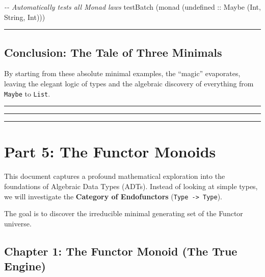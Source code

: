 \documentclass[
]{article}
\newenvironment{Shaded}{}{}
\newcommand{\CommentTok}[1]{\textcolor[rgb]{0.38,0.63,0.69}{\textit{#1}}}
\newcommand{\DataTypeTok}[1]{\textcolor[rgb]{0.56,0.13,0.00}{#1}}
\newcommand{\FunctionTok}[1]{\textcolor[rgb]{0.02,0.16,0.49}{#1}}
\newcommand{\NormalTok}[1]{#1}
\newcommand{\OtherTok}[1]{\textcolor[rgb]{0.00,0.44,0.13}{#1}}
\begin{document}
\begin{Shaded}
\begin{Highlighting}[]
  \CommentTok{{-}{-} Automatically tests all Monad laws}
\NormalTok{  testBatch (monad (}\FunctionTok{undefined}\OtherTok{ ::} \DataTypeTok{Maybe}\NormalTok{ (}\DataTypeTok{Int}\NormalTok{, }\DataTypeTok{String}\NormalTok{, }\DataTypeTok{Int}\NormalTok{)))}
\end{Highlighting}
\end{Shaded}

\begin{center}\rule{0.5\linewidth}{0.5pt}\end{center}

\subsection{Conclusion: The Tale of Three
Minimals}\label{conclusion-the-tale-of-three-minimals}

By starting from these absolute minimal examples, the ``magic''
evaporates, leaving the elegant logic of types and the algebraic
discovery of everything from \texttt{Maybe} to \texttt{List}.

\begin{center}\rule{0.5\linewidth}{0.5pt}\end{center}

\begin{center}\rule{0.5\linewidth}{0.5pt}\end{center}

\begin{center}\rule{0.5\linewidth}{0.5pt}\end{center}

\section{Part 5: The Functor Monoids}\label{part-5-the-functor-monoids}

This document captures a profound mathematical exploration into the
foundations of Algebraic Data Types (ADTs). Instead of looking at simple
types, we will investigate the \textbf{Category of Endofunctors}
(\texttt{Type\ -\textgreater{}\ Type}).

The goal is to discover the irreducible minimal generating set of the
Functor universe.

\subsection{Chapter 1: The Functor Monoid (The True
Engine)}\label{chapter-1-the-functor-monoid-the-true-engine}
\end{document}
